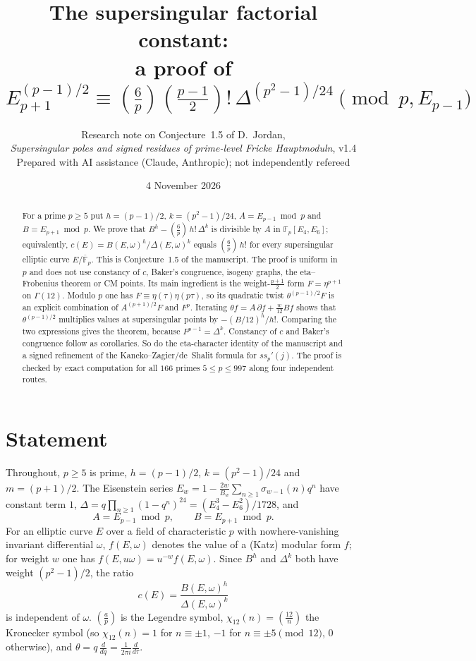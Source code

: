 \documentclass[11pt,a4paper]{article}
\title{The supersingular factorial constant:\\ a proof of
$E_{p+1}^{(p-1)/2}\equiv\left(\frac{6}{p}\right)\left(\frac{p-1}{2}\right)!\,\Delta^{(p^2-1)/24}
\pmod{p,E_{p-1}}$}
\author{\normalsize Research note on Conjecture~1.5 of D.~Jordan,\\
\normalsize \emph{Supersingular poles and signed residues of prime-level Fricke Hauptmoduln}, v1.4\\[4pt]
\small Prepared with AI assistance (Claude, Anthropic); not independently refereed}
\date{4 November 2026}
\numberwithin{equation}{section}
\theoremstyle{definition}
\theoremstyle{remark}
\newcommand{\Fp}{\mathbb F_p}
\newcommand{\Fb}{\overline{\mathbb F}_p}
\newcommand{\Lp}[1]{\left(\frac{#1}{p}\right)}
\newcommand{\leg}[2]{\left(\frac{#1}{#2}\right)}
\begin{document}
\maketitle

\begin{abstract}
For a prime $p\ge5$ put $h=(p-1)/2$, $k=(p^2-1)/24$, $A=E_{p-1}\bmod p$ and $B=E_{p+1}\bmod p$.
We prove that $B^{h}-\Lp{6}\,h!\,\Delta^{k}$ is divisible by $A$ in $\Fp[E_4,E_6]$; equivalently,
$c(E)=B(E,\omega)^h/\Delta(E,\omega)^k$ equals $\Lp6\,h!$ for every supersingular elliptic curve
$E/\Fb$. This is Conjecture~1.5 of the manuscript. The proof is uniform in $p$ and does not
use constancy of $c$, Baker's congruence, isogeny graphs, the eta--Frobenius theorem or CM
points. Its main ingredient is the weight-$\frac{p+1}{2}$ form $F=\eta^{p+1}$ on $\Gamma(12)$.
Modulo $p$ one has $F\equiv\eta(\tau)\eta(p\tau)$, so its quadratic twist
$\theta^{(p-1)/2}F$ is an explicit combination of $A^{(p+1)/2}F$ and $F^p$. Iterating
$\theta f=A\,\partial f+\frac{w}{12}Bf$ shows that $\theta^{(p-1)/2}$ multiplies values at
supersingular points by $-(B/12)^{h}/h!$. Comparing the two expressions gives the theorem,
because $F^{p-1}=\Delta^k$. Constancy of $c$ and Baker's congruence follow as corollaries. So
do the eta-character identity of the manuscript and a signed refinement of the
Kaneko--Zagier/de~Shalit formula for $ss_p'(j)$. The proof is checked by exact computation
for all $166$ primes $5\le p\le 997$ along four independent routes.
\end{abstract}

\section{Statement}\label{sec:statement}

Throughout, $p\ge5$ is prime, $h=(p-1)/2$, $k=(p^2-1)/24$ and $m=(p+1)/2$. The Eisenstein series
$E_w=1-\frac{2w}{B_w}\sum_{n\ge1}\sigma_{w-1}(n)q^n$ have constant term $1$,
$\Delta=q\prod_{n\ge1}(1-q^n)^{24}=(E_4^3-E_6^2)/1728$, and
\[
A=E_{p-1}\bmod p,\qquad B=E_{p+1}\bmod p .
\]
For an elliptic curve $E$ over a field of characteristic $p$ with nowhere-vanishing invariant
differential $\omega$, $f(E,\omega)$ denotes the value of a (Katz) modular form $f$; for weight
$w$ one has $f(E,u\omega)=u^{-w}f(E,\omega)$. Since $B^h$ and $\Delta^k$ both have weight
$(p^2-1)/2$, the ratio
\[
c(E)=\frac{B(E,\omega)^{h}}{\Delta(E,\omega)^{k}}
\]
is independent of $\omega$. $\Lp{a}$ is the Legendre symbol, $\chi_{12}(n)=\leg{12}{n}$ the
Kronecker symbol (so $\chi_{12}(n)=1$ for $n\equiv\pm1$, $-1$ for $n\equiv\pm5\pmod{12}$, $0$
otherwise), and $\theta=q\,\frac{d}{dq}=\frac{1}{2\pi i}\frac{d}{d\tau}$.
\end{document}
